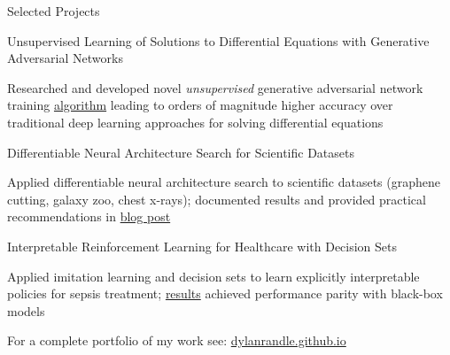 \documentclass{resume} %
\begin{document}

\newpage

\begin{rSection}{Selected Projects}

\begin{rSubsection}{Unsupervised Learning of Solutions to Differential Equations with Generative Adversarial Networks}{}{}{}

\item Researched and developed novel \emph{unsupervised} generative adversarial network training \href{https://dylanrandle.github.io/denn/deqgan.html}{algorithm} leading to orders of magnitude higher accuracy over traditional deep learning approaches for solving differential equations
  
\end{rSubsection}

\begin{rSubsection}{Differentiable Neural Architecture Search for Scientific Datasets}{}{}{}

\item Applied differentiable neural architecture search to scientific datasets (graphene cutting, galaxy zoo, chest x-rays); documented results and provided practical recommendations in \href{https://towardsdatascience.com/investigating-differentiable-neural-architecture-search-for-scientific-datasets-62899be8714e}{blog post}
	
\end{rSubsection}

\begin{rSubsection}{Interpretable Reinforcement Learning for Healthcare with Decision Sets}{}{}{}

\item Applied imitation learning and decision sets to learn explicitly interpretable policies for sepsis treatment; \href{https://dylanrandle.github.io/irl/irl.html}{results} achieved performance parity with black-box models
	
\end{rSubsection}

For a complete portfolio of my work see: \url{dylanrandle.github.io}

\end{rSection}

\end{document}
